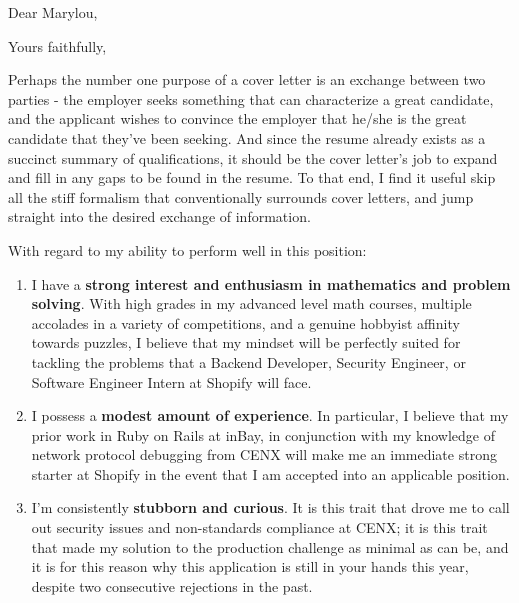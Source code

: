 \documentclass[12pt,a4paper,sans]{moderncv}        %
\begin{document}
\date{January 18, 2019}
\opening{Dear Marylou,}
\closing{Yours faithfully,}
\makelettertitle

Perhaps the number one purpose of a cover letter is an exchange between two 
parties - the employer seeks something that can characterize a great candidate, 
and the applicant wishes to convince the employer that he/she is the great 
candidate that they've been seeking. And since the resume already exists as a 
succinct summary of qualifications, it should be the cover letter's job to 
expand and fill in any gaps to be found in the resume. To that end, I find it 
useful skip all the stiff formalism that conventionally surrounds cover letters, 
and jump straight into the desired exchange of information.

With regard to my ability to perform well in this position:
\smallskip
\begin{enumerate}
    \item I have a \textbf{strong interest and enthusiasm in mathematics and 
            problem solving}. With high grades in my advanced level math 
        courses, multiple accolades in a variety of competitions, and a genuine 
        hobbyist affinity towards puzzles, I believe that my mindset will be 
        perfectly suited for tackling the problems that a Backend Developer, 
        Security Engineer, or Software Engineer Intern at Shopify will face.
        \smallskip
    \item I possess a \textbf{modest amount of experience}. In particular, I 
        believe that my prior work in Ruby on Rails at inBay, in conjunction 
        with my knowledge of network protocol debugging from CENX will make me 
        an immediate strong starter at Shopify in the event that I am accepted 
        into an applicable position.
        \smallskip
    \item I'm consistently \textbf{stubborn and curious}. It is this trait that 
        drove me to call out security issues and non-standards compliance at 
        CENX; it is this trait that made my solution to the production challenge 
        as minimal as can be, and it is for this reason why this application is 
        still in your hands this year, despite two consecutive rejections in the 
        past.
\end{enumerate}
\end{document}
